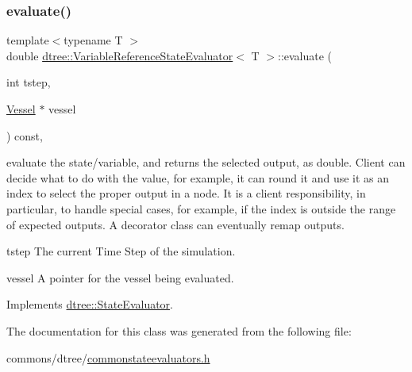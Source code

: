\subsubsection{\texorpdfstring{evaluate()}{evaluate()}}
{\footnotesize\ttfamily template$<$typename T $>$ \\
double \mbox{\hyperlink{classdtree_1_1_variable_reference_state_evaluator}{dtree\+::\+Variable\+Reference\+State\+Evaluator}}$<$ T $>$\+::evaluate (\begin{DoxyParamCaption}\item[{int}]{tstep,  }\item[{\mbox{\hyperlink{class_vessel}{Vessel}} $\ast$}]{vessel }\end{DoxyParamCaption}) const\hspace{0.3cm}{\ttfamily [inline]}, {\ttfamily [virtual]}}



evaluate the state/variable, and returns the selected output, as double. Client can decide what to do with the value, for example, it can round it and use it as an index to select the proper output in a node. It is a client responsibility, in particular, to handle special cases, for example, if the index is outside the range of expected outputs. A decorator class can eventually remap outputs. 

\begin{DoxyItemize}
\item tstep The current Time Step of the simulation. \item vessel A pointer for the vessel being evaluated. \end{DoxyItemize}


Implements \mbox{\hyperlink{classdtree_1_1_state_evaluator_ab57666219fbdc728f40d9d5acd5726cb}{dtree\+::\+State\+Evaluator}}.



The documentation for this class was generated from the following file\+:\begin{DoxyCompactItemize}
\item 
commons/dtree/\mbox{\hyperlink{commonstateevaluators_8h}{commonstateevaluators.\+h}}\end{DoxyCompactItemize}
